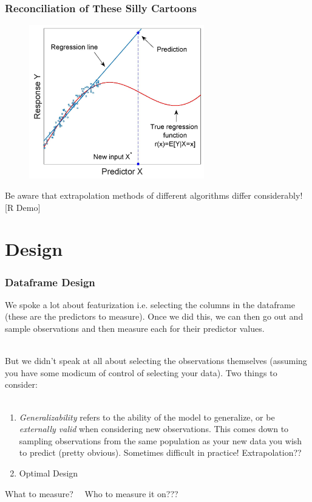 \documentclass[slides]{beamer} %
\begin{document}
\begin{frame}\frametitle{Reconciliation of These Silly Cartoons}

\vspace{-0.3cm} 
\begin{figure}
\centering
\includegraphics[width=3.0in]{extrap.jpg}
\end{figure}
 \pause 
 \small
\vspace{-0.1cm} 
Be aware that extrapolation methods of different algorithms differ considerably! [R Demo]

\end{frame}

\section{Design}

\begin{frame}\frametitle{Dataframe Design}

\small

We spoke a lot about featurization i.e. selecting the columns in the dataframe (these are the predictors to measure). Once we did this, we can then go out and sample observations and then measure each for their predictor values. \\~\\ \pause

But we didn't speak at all about selecting the observations themselves (assuming you have some modicum of control of selecting your data). Two things to consider: \\~\\  \pause

\begin{enumerate}
\item \emph{Generalizability} refers to the ability of the model to generalize, or be \emph{externally valid} when considering new observations. This comes down to sampling observations from the same population as your new data you wish to predict (pretty obvious). Sometimes difficult in practice! \pause Extrapolation?? \pause 
\item Optimal Design \pause
\end{enumerate}

What to measure? \checkmark ~~\pause Who to measure it on???	
\end{frame}
\end{document}
